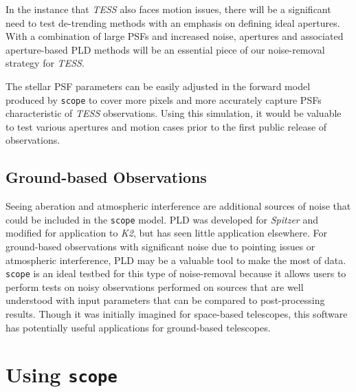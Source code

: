 \documentclass[12pt,preprint]{aastex}
\begin{document}
In the instance that \textit{TESS} also faces motion issues, there will be a significant need to test de-trending methods with an emphasis on defining ideal apertures. With a combination of large PSFs and increased noise, apertures and associated aperture-based PLD methods will be an essential piece of our noise-removal strategy for \textit{TESS}.

The stellar PSF parameters can be easily adjusted in the forward model produced by \texttt{scope} to cover more pixels and more accurately capture PSFs characteristic of \textit{TESS} observations. Using this simulation, it would be valuable to test various apertures and motion cases prior to the first public release of observations.

\subsection{Ground-based Observations}

Seeing aberation and atmospheric interference are additional sources of noise that could be included in the \texttt{scope} model. PLD was developed for \textit{Spitzer} and modified for application to \textit{K2}, but has seen little application elsewhere. For ground-based observations with significant noise due to pointing issues or atmospheric interference, PLD may be a valuable tool to make the most of data. \texttt{scope} is an ideal testbed for this type of noise-removal because it allows users to perform tests on noisy observations performed on sources that are well understood with input parameters that can be compared to post-processing results. Though it was initially imagined for space-based telescopes, this software has potentially useful applications for ground-based telescopes.

\section{Using \texttt{scope}}
\end{document}
